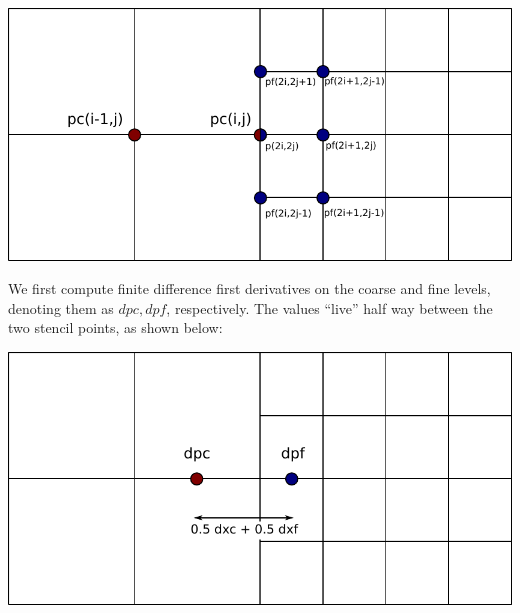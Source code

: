 \documentclass{article}
\begin{document}
\begin{center}
  \includegraphics{stencil1}
\end{center}

We first compute finite difference first derivatives on the coarse and fine levels, denoting them as $dpc,dpf$, respectively.
The values ``live'' half way between the two stencil points, as shown below:

\begin{center}
  \includegraphics{stencil2}
\end{center}
\end{document}
